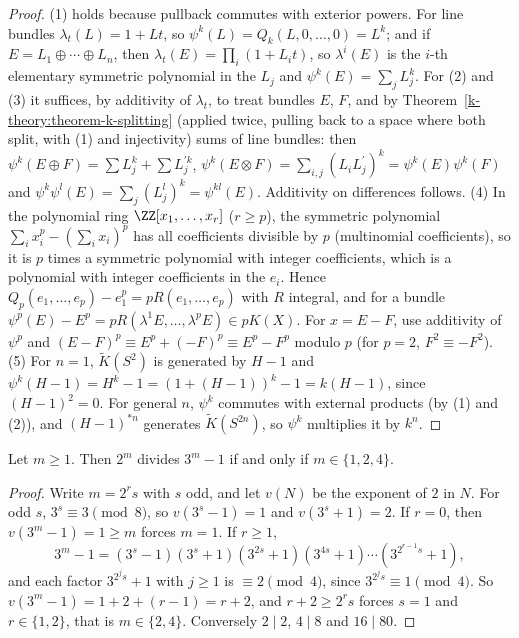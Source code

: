 \begin{proof}
(1) holds because pullback commutes with exterior powers. For line bundles $\lambda_t(L) = 1 + Lt$, so $\psi^k(L) = Q_k(L, 0, \ldots, 0) = L^k$; and if $E = L_1 \oplus \cdots \oplus L_n$, then
$\lambda_t(E) = \prod_i(1 + L_it)$, so $\lambda^i(E)$ is the $i$-th elementary symmetric polynomial in the $L_j$ and $\psi^k(E) = \sum_jL_j^k$. For (2) and (3) it suffices, by additivity of $\lambda_t$, to treat
bundles $E$, $F$, and by Theorem~\ref{k-theory:theorem-k-splitting} (applied twice, pulling back to a space where both split, with (1) and injectivity) sums of line bundles: then
$\psi^k(E \oplus F) = \sum L_j^k + \sum L_j^{\prime k}$, $\psi^k(E \otimes F) = \sum_{i,j}(L_iL^{\prime}_j)^k = \psi^k(E)\psi^k(F)$ and $\psi^k\psi^l(E) = \sum_j(L_j^l)^k = \psi^{kl}(E)$. Additivity on differences
follows. (4) In the polynomial ring $\ZZ[x_1, \ldots, x_r]$ ($r \geq p$), the symmetric polynomial $\sum_ix_i^p - (\sum_ix_i)^p$ has all coefficients divisible by $p$ (multinomial coefficients), so it is $p$ times a symmetric
polynomial with integer coefficients, which is a polynomial with integer coefficients in the $e_i$. Hence $Q_p(e_1, \ldots, e_p) - e_1^p = pR(e_1, \ldots, e_p)$ with $R$ integral, and for a bundle
$\psi^p(E) - E^p = pR(\lambda^1E, \ldots, \lambda^pE) \in pK(X)$. For $x = E - F$, use additivity of $\psi^p$ and $(E - F)^p \equiv E^p + (-F)^p \equiv E^p - F^p$ modulo $p$ (for $p = 2$, $F^2 \equiv -F^2$).
(5) For $n = 1$, $\tilde{K}(S^2)$ is generated by $H - 1$ and $\psi^k(H - 1) = H^k - 1 = (1 + (H - 1))^k - 1 = k(H - 1)$, since $(H - 1)^2 = 0$. For general $n$, $\psi^k$ commutes with external products (by (1) and
(2)), and $(H - 1)^{*n}$ generates $\tilde{K}(S^{2n})$, so $\psi^k$ multiplies it by $k^n$.
\end{proof}

\begin{lemma}\label{k-theory:lemma-two-adic}
Let $m \geq 1$. Then $2^m$ divides $3^m - 1$ if and only if $m \in \{1, 2, 4\}$.
\end{lemma}

\begin{proof}
Write $m = 2^rs$ with $s$ odd, and let $v(N)$ be the exponent of $2$ in $N$. For odd $s$, $3^s \equiv 3 \pmod 8$, so $v(3^s - 1) = 1$ and $v(3^s + 1) = 2$. If $r = 0$, then $v(3^m - 1) = 1 \geq m$
forces $m = 1$. If $r \geq 1$,
\[
3^m - 1 = (3^s - 1)(3^s + 1)(3^{2s} + 1)(3^{4s} + 1)\cdots(3^{2^{r-1}s} + 1),
\]
and each factor $3^{2^js} + 1$ with $j \geq 1$ is $\equiv 2 \pmod 4$, since $3^{2^js} \equiv 1 \pmod 4$. So $v(3^m - 1) = 1 + 2 + (r - 1) = r + 2$, and $r + 2 \geq 2^rs$ forces $s = 1$ and $r \in \{1, 2\}$, that is
$m \in \{2, 4\}$. Conversely $2 \mid 2$, $4 \mid 8$ and $16 \mid 80$.
\end{proof}

